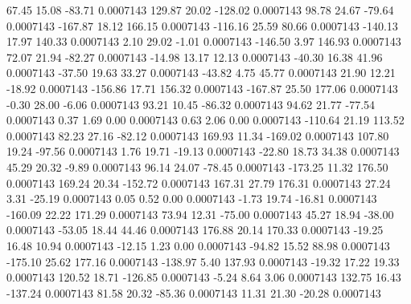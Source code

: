        67.45       15.08      -83.71     0.0007143
      129.87       20.02     -128.02     0.0007143
       98.78       24.67      -79.64     0.0007143
     -167.87       18.12      166.15     0.0007143
     -116.16       25.59       80.66     0.0007143
     -140.13       17.97      140.33     0.0007143
        2.10       29.02       -1.01     0.0007143
     -146.50        3.97      146.93     0.0007143
       72.07       21.94      -82.27     0.0007143
      -14.98       13.17       12.13     0.0007143
      -40.30       16.38       41.96     0.0007143
      -37.50       19.63       33.27     0.0007143
      -43.82        4.75       45.77     0.0007143
       21.90       12.21      -18.92     0.0007143
     -156.86       17.71      156.32     0.0007143
     -167.87       25.50      177.06     0.0007143
       -0.30       28.00       -6.06     0.0007143
       93.21       10.45      -86.32     0.0007143
       94.62       21.77      -77.54     0.0007143
        0.37        1.69        0.00     0.0007143
        0.63        2.06        0.00     0.0007143
     -110.64       21.19      113.52     0.0007143
       82.23       27.16      -82.12     0.0007143
      169.93       11.34     -169.02     0.0007143
      107.80       19.24      -97.56     0.0007143
        1.76       19.71      -19.13     0.0007143
      -22.80       18.73       34.38     0.0007143
       45.29       20.32       -9.89     0.0007143
       96.14       24.07      -78.45     0.0007143
     -173.25       11.32      176.50     0.0007143
      169.24       20.34     -152.72     0.0007143
      167.31       27.79      176.31     0.0007143
       27.24        3.31      -25.19     0.0007143
        0.05        0.52        0.00     0.0007143
       -1.73       19.74      -16.81     0.0007143
     -160.09       22.22      171.29     0.0007143
       73.94       12.31      -75.00     0.0007143
       45.27       18.94      -38.00     0.0007143
      -53.05       18.44       44.46     0.0007143
      176.88       20.14      170.33     0.0007143
      -19.25       16.48       10.94     0.0007143
      -12.15        1.23        0.00     0.0007143
      -94.82       15.52       88.98     0.0007143
     -175.10       25.62      177.16     0.0007143
     -138.97        5.40      137.93     0.0007143
      -19.32       17.22       19.33     0.0007143
      120.52       18.71     -126.85     0.0007143
       -5.24        8.64        3.06     0.0007143
      132.75       16.43     -137.24     0.0007143
       81.58       20.32      -85.36     0.0007143
       11.31       21.30      -20.28     0.0007143
